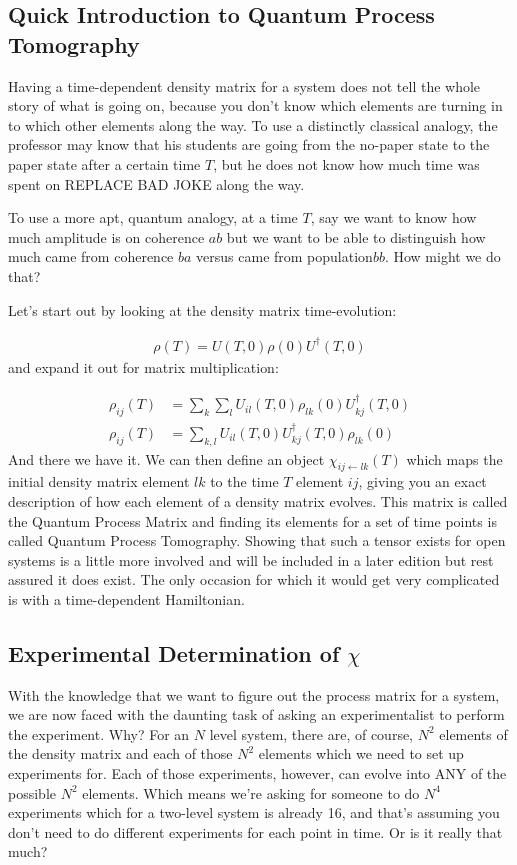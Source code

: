 \subsection{Quick Introduction to Quantum Process Tomography}
Having a time-dependent density matrix for a system does not tell the whole story of what is going on, because you don't know which elements are turning in to which other elements along the way.  To use a distinctly classical analogy, the professor may know that his students are going from the no-paper state to the paper state after a certain time $T$, but he does not know how much time was spent on REPLACE BAD JOKE along the way.

To use a more apt, quantum analogy, at a time $T$, say we want to know how much amplitude is on coherence $ab$ but we want to be able to distinguish how much came from coherence $ba$ versus came from population$bb$.  How might we do that?

Let's start out by looking at the density matrix time-evolution:

\begin{align}
	\rho(T) = U(T, 0) \rho(0) U^{\dagger}(T,0)
\end{align}
and expand it out for matrix multiplication:

\begin{align}
	\rho_{ij}(T) &= \sum_k \sum_l U_{il}(T, 0) \rho_{lk}(0) U_{kj}^{\dagger}(T,0) \\
	\rho_{ij}(T) &= \sum_{k,l} U_{il}(T, 0) U_{kj}^{\dagger}(T,0) \rho_{lk}(0)
\end{align}
And there we have it.  We can then define an object $\chi_{ij \leftarrow lk} (T)$ which maps the initial density matrix element $lk$ to the time $T$ element $ij$, giving you an exact description of how each element of a density matrix evolves.  This matrix is called the Quantum Process Matrix and finding its elements for a set of time points is called Quantum Process Tomography.  Showing that such a tensor exists for open systems is a little more involved and will be included in a later edition but rest assured it does exist.  The only occasion for which it would get very complicated is with a time-dependent Hamiltonian.

\subsection{Experimental Determination of $\chi$}
With the knowledge that we want to figure out the process matrix for a system, we are now faced with the daunting task of asking an experimentalist to perform the experiment.  Why?  For an $N$ level system, there are, of course, $N^2$ elements of the density matrix and each of those $N^2$ elements which we need to set up experiments for.  Each of those experiments, however, can evolve into ANY of the possible $N^2$ elements.  Which means we're asking for someone to do $N^4$ experiments which for a two-level system is already 16, and that's assuming you don't need to do different experiments for each point in time.  Or is it really that much?

